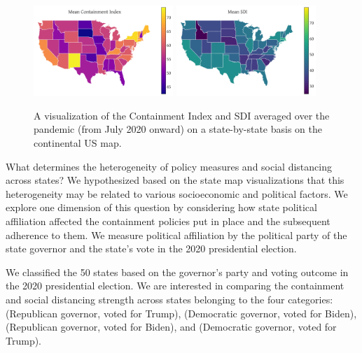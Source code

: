 \documentclass[dvipsnames]{article}
\begin{document}
\begin{figure}[h!]
    \centering
    \includegraphics[width=0.47\textwidth]{mean_containment.pdf}
    \includegraphics[width=0.47\textwidth]{mean_sdi.pdf}
    \caption{A visualization of the Containment Index and SDI averaged over the pandemic (from July 2020 onward) on a state-by-state basis on the continental US map.}
    \label{fig:us_map}
\end{figure}

What determines the heterogeneity of policy measures and social distancing across states? We hypothesized based on the state map visualizations that this heterogeneity may be related to various socioeconomic and political factors. We explore one dimension of this question by considering how state political affiliation affected the containment policies put in place and the subsequent adherence to them. We measure political affiliation by the political party of the state governor and the state's vote in the 2020 presidential election. 

We classified the 50 states based on the governor's party and voting outcome in the 2020 presidential election. We are interested in comparing the containment and social distancing strength across states belonging to the four categories: (Republican governor, voted for Trump), (Democratic governor, voted for Biden), (Republican governor, voted for Biden), and (Democratic governor, voted for Trump).
\end{document}
